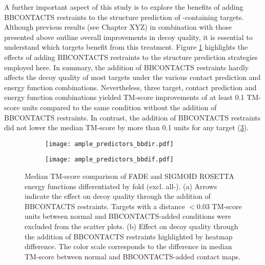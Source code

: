 A further important aspect of this study is to explore the benefits of adding BBCONTACTS restraints to the structure prediction of \textbeta-containing targets. Although previous results (see Chapter XYZ) in combination with those presented above outline overall improvements in decoy quality, it is essential to understand which targets benefit from this treatment. Figure \ref{fig:ample_predictor_bbdir} highlights the effects of adding BBCONTACTS restraints to the structure prediction strategies employed here. In summary, the addition of BBCONTACTS restraints hardly affects the decoy quality of most targets under the various contact prediction and energy function combinations. Nevertheless, three target, contact prediction and energy function combinations yielded TM-score improvements of at least 0.1 TM-score units compared to the same condition without the addition of BBCONTACTS restraints. In contrast, the addition of BBCONTACTS restraints did not lower the median TM-score by more than 0.1 units for any target (\cref{fig:ample_predictor_bbdif}).

\begin{figure}[H]
    \centering
    \begin{subfigure}[b]{\textwidth}
        \centering
        \texttt{[image: ample\_predictors\_bbdir.pdf]}
        \caption{}
        \label{fig:ample_predictor_bbdir}
    \end{subfigure}
    
    \begin{subfigure}[b]{\textwidth}
        \centering
        \texttt{[image: ample\_predictors\_bbdif.pdf]}
        \caption{}
        \label{fig:ample_predictor_bbdif}
    \end{subfigure}

    \caption{Median TM-score comparison of FADE and SIGMOID ROSETTA energy functions differentiated by fold (excl. all-\textalpha). (a) Arrows indicate the effect on decoy quality through the addition of BBCONTACTS restraints. Targets with a distance $<0.03$ TM-score units between normal and BBCONTACTS-added conditions were excluded from the scatter plots. (b) Effect on decoy quality through the addition of BBCONTACTS restraints highlighted by heatmap difference. The color scale corresponds to the difference in median TM-score between normal and BBCONTACTS-added contact maps.}
\end{figure}

